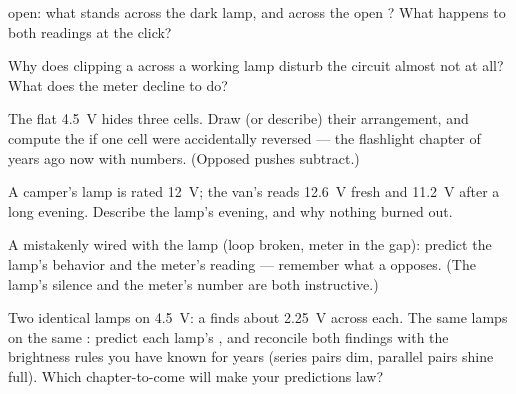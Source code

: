 \begin{exercise}[$\star$]\label{exo:g8:voltage-voltmeter:7}
 open: what stands across the dark lamp, and across the
open ? What happens to both readings at the click?
\end{exercise}

\begin{exercise}[$\star$]\label{exo:g8:voltage-voltmeter:8}
Why does clipping a  across a working lamp disturb
the circuit almost not at all? What does the meter decline to
do?
\end{exercise}

\begin{exercise}[$\star\star$]\label{exo:g8:voltage-voltmeter:9}
The flat \qty{4.5}{V}  hides three cells. Draw (or
describe) their arrangement, and compute the  if one
cell were accidentally reversed --- the flashlight chapter of
years ago now with numbers. (Opposed pushes subtract.)
\end{exercise}

\begin{exercise}[$\star\star$]\label{exo:g8:voltage-voltmeter:10}
A camper's lamp is rated \qty{12}{V}; the van's  reads
\qty{12.6}{V} fresh and \qty{11.2}{V} after a long evening.
Describe the lamp's evening, and why nothing burned out.
\end{exercise}

\begin{exercise}[$\star\star$]\label{exo:g8:voltage-voltmeter:11}
A  mistakenly wired \emph{} with the lamp
(loop broken, meter in the gap): predict the lamp's behavior
and the meter's reading --- remember what a  opposes.
(The lamp's silence and the meter's number are both
instructive.)
\end{exercise}

\begin{exercise}[$\star\star\star$]\label{exo:g8:voltage-voltmeter:12}
Two identical lamps  on \qty{4.5}{V}: a 
finds about \qty{2.25}{V} across each. The same lamps  on the same : predict each lamp's , and
reconcile both findings with the brightness rules you have
known for years (series pairs dim, parallel pairs shine
full). Which chapter-to-come will make your predictions law?
\end{exercise}


